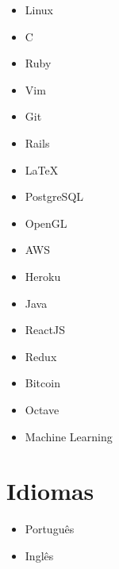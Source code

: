 \documentclass[a4paper,twoside]{simplecv}
\begin{document}
\begin{multicols}{4}
	\raggedcolumns
	\begin{itemize}
		\item Linux
		\item C
		\item Ruby
		\item Vim
		\item Git
		\item Rails
		\item \LaTeX{}
		\item PostgreSQL
		\item OpenGL
		\item AWS
		\item Heroku
		\item Java
		\item ReactJS
		\item Redux
		\item Bitcoin
		\item Octave
		\item Machine Learning
	\end{itemize}
\end{multicols}

\section{Idiomas}

\begin{multicols}{4}
	\raggedcolumns
	\begin{itemize}
		\item Português
		\item Inglês
	\end{itemize}
\end{multicols}

%
\end{document}
